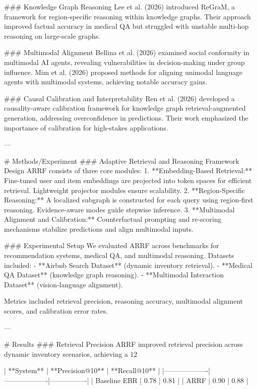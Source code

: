 ### Knowledge Graph Reasoning  
Lee et al. (2026) introduced ReGraM, a framework for region-specific reasoning within knowledge graphs. Their approach improved factual accuracy in medical QA but struggled with unstable multi-hop reasoning on large-scale graphs.

### Multimodal Alignment  
Bellina et al. (2026) examined social conformity in multimodal AI agents, revealing vulnerabilities in decision-making under group influence. Mim et al. (2026) proposed methods for aligning unimodal language agents with multimodal systems, achieving notable accuracy gains.

### Causal Calibration and Interpretability  
Ren et al. (2026) developed a causality-aware calibration framework for knowledge graph retrieval-augmented generation, addressing overconfidence in predictions. Their work emphasized the importance of calibration for high-stakes applications.

---

# Methods/Experiment  
### Adaptive Retrieval and Reasoning Framework Design  
ARRF consists of three core modules:  
1. **Embedding-Based Retrieval:** Fine-tuned user and item embeddings are projected into token spaces for efficient retrieval. Lightweight projector modules ensure scalability.  
2. **Region-Specific Reasoning:** A localized subgraph is constructed for each query using region-first reasoning. Evidence-aware modes guide stepwise inference.  
3. **Multimodal Alignment and Calibration:** Counterfactual prompting and re-scoring mechanisms stabilize predictions and align multimodal inputs.  

### Experimental Setup  
We evaluated ARRF across benchmarks for recommendation systems, medical QA, and multimodal reasoning. Datasets included:  
- **Airbnb Search Dataset** (dynamic inventory retrieval).  
- **Medical QA Dataset** (knowledge graph reasoning).  
- **Multimodal Interaction Dataset** (vision-language alignment).  

Metrics included retrieval precision, reasoning accuracy, multimodal alignment scores, and calibration error rates.

---

# Results  
### Retrieval Precision  
ARRF improved retrieval precision across dynamic inventory scenarios, achieving a 12%

| **System**       | **Precision@10** | **Recall@10** |  
|-------------------|-------------------|----------------|  
| Baseline EBR     | 0.78              | 0.81           |  
| ARRF             | 0.90              | 0.88           |  

